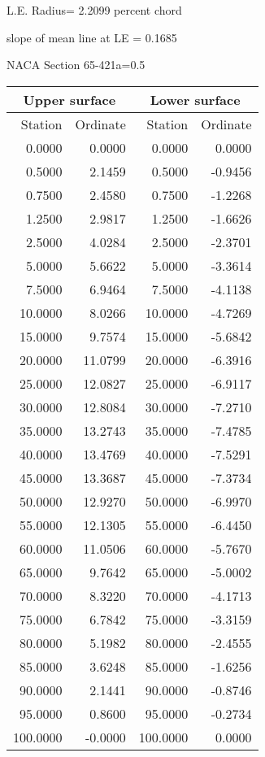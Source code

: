 \documentclass[11pt]{book}
\begin{document}
L.E. Radius=  2.2099 percent chord


 slope of mean line at LE =  0.1685
 \newpage
  \label{s65-421a=0.5}
 \begin{Large}
 NACA Section 65-421a=0.5
 \end{Large}
  
 \vspace{8mm}
 \begin{tabular}{|r|r|r|r|} \hline 
 \multicolumn{2}{|c|}{Upper surface} & \multicolumn{2}{|c|}{Lower surface} \\
 \hline
 Station & Ordinate & Station & Ordinate \\
 \hline
0.0000 & 0.0000 & 0.0000 & 0.0000 \\
0.5000 & 2.1459 & 0.5000 & -0.9456 \\
0.7500 & 2.4580 & 0.7500 & -1.2268 \\
1.2500 & 2.9817 & 1.2500 & -1.6626 \\
2.5000 & 4.0284 & 2.5000 & -2.3701 \\
5.0000 & 5.6622 & 5.0000 & -3.3614 \\
7.5000 & 6.9464 & 7.5000 & -4.1138 \\
10.0000 & 8.0266 & 10.0000 & -4.7269 \\
15.0000 & 9.7574 & 15.0000 & -5.6842 \\
20.0000 & 11.0799 & 20.0000 & -6.3916 \\
25.0000 & 12.0827 & 25.0000 & -6.9117 \\
30.0000 & 12.8084 & 30.0000 & -7.2710 \\
35.0000 & 13.2743 & 35.0000 & -7.4785 \\
40.0000 & 13.4769 & 40.0000 & -7.5291 \\
45.0000 & 13.3687 & 45.0000 & -7.3734 \\
50.0000 & 12.9270 & 50.0000 & -6.9970 \\
55.0000 & 12.1305 & 55.0000 & -6.4450 \\
60.0000 & 11.0506 & 60.0000 & -5.7670 \\
65.0000 & 9.7642 & 65.0000 & -5.0002 \\
70.0000 & 8.3220 & 70.0000 & -4.1713 \\
75.0000 & 6.7842 & 75.0000 & -3.3159 \\
80.0000 & 5.1982 & 80.0000 & -2.4555 \\
85.0000 & 3.6248 & 85.0000 & -1.6256 \\
90.0000 & 2.1441 & 90.0000 & -0.8746 \\
95.0000 & 0.8600 & 95.0000 & -0.2734 \\
100.0000 & -0.0000 & 100.0000 & 0.0000 \\
 \hline 
 \end{tabular}
\end{document}

